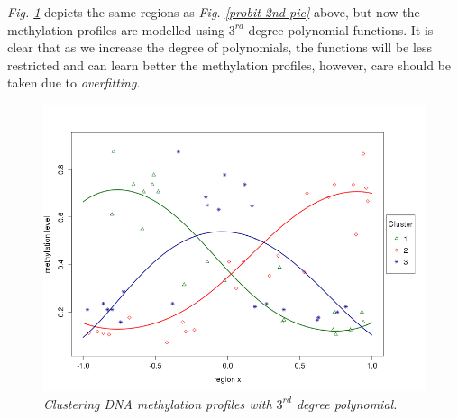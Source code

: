 \emph{Fig. \ref{probit-3rd-pic}} depicts the same regions as \emph{Fig. \ref{probit-2nd-pic}} above, but now the methylation profiles are modelled using $3^{rd}$ degree polynomial functions. It is clear that as we increase the degree of polynomials, the functions will be less restricted and can learn better the methylation profiles, however, care should be taken due to \emph{overfitting}.
\begin{figure}[!ht]
\begin{center}
 \includegraphics[scale = 0.46]{images/probit3rd.png}
\caption{\emph{Clustering DNA methylation profiles with $3^{rd}$ degree polynomial.}}
\label{probit-3rd-pic}
\end{center}
\end{figure}